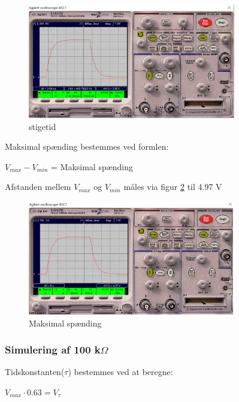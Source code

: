 \begin{figure}[h]
 \begin{center}
  \includegraphics[height=5cm]{P_Fig/figur4_10k_50Hz_stigetid.png}
  \caption{stigetid}
  \label{10k.50Hz.stigetid}
 \end{center}
\end{figure}

Maksimal spænding bestemmes ved formlen:
\begin{center}
$V_{max} - V_{min}$ = Maksimal spænding
\end{center}

Afstanden mellem $V_{max}$ og $V_{min}$ måles via figur \ref{10k.50Hz.min.max} til 4.97 V

\begin{figure}[h]
 \begin{center}
  \includegraphics[height=5cm]{P_Fig/figur2_10k_50Hz_min_max.png}
  \caption{Maksimal spænding}
  \label{10k.50Hz.min.max}
 \end{center}
\end{figure}

\newpage
\subsubsection{Simulering af 100 k$\Omega$ }
Tidskonstanten($\tau$) bestemmes ved at beregne:

\begin{center}
$V_{max} \cdot 0.63 = V_{\tau}$
\end{center}


